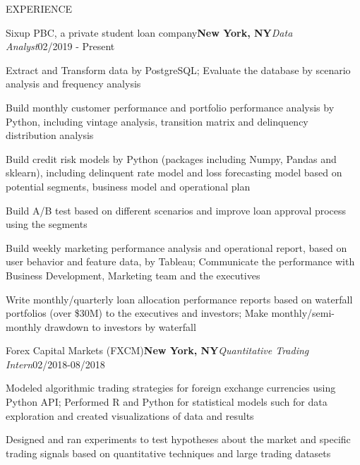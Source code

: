 \documentclass{resume} %
\begin{document}
\begin{rSection}{EXPERIENCE}
\begin{rSubsection}{Sixup PBC, a private student loan company}{\bf New York, NY}{\textit{Data Analyst}}{02/2019 - Present}
	\item Extract and Transform data by PostgreSQL; Evaluate the database by scenario analysis and frequency analysis
	\item Build monthly customer performance and portfolio performance analysis by Python, including vintage analysis, transition matrix and delinquency distribution analysis
	\item Build credit risk models by Python (packages including Numpy, Pandas and sklearn), including delinquent rate model and loss forecasting model based on potential segments, business model and operational plan
    \item Build A/B test based on different scenarios and improve loan approval process using the segments
    \item Build weekly marketing performance analysis and operational report, based on user behavior and feature data, by Tableau; Communicate the performance with Business Development, Marketing team and the executives
    \item Write monthly/quarterly loan allocation performance reports based on waterfall portfolios (over \$30M) to the executives and investors; Make monthly/semi-monthly drawdown to investors by waterfall
\end{rSubsection}

\begin{rSubsection}{Forex Capital Markets (FXCM)}{\bf New York, NY}{\textit{Quantitative Trading Intern}}{02/2018-08/2018}
	\item Modeled algorithmic trading strategies for foreign exchange currencies using Python API; Performed R and Python for statistical models such for data exploration and created visualizations of data and results
	\item Designed and ran experiments to test hypotheses about the market and specific trading signals based on quantitative techniques and large trading datasets
\end{rSubsection}
\end{rSection}
\end{document}
